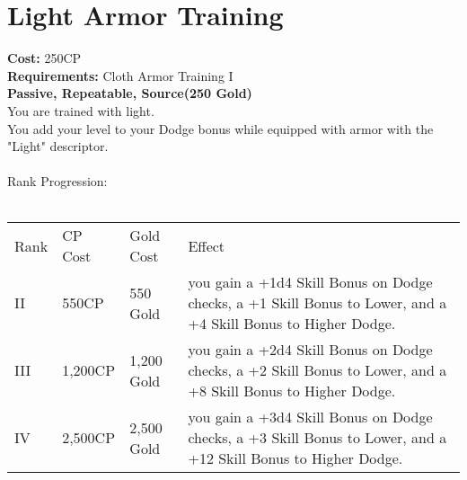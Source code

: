 \section{Light Armor Training}\label{perk:lightArmorTraining}
\textbf{Cost:} 250CP\\
\textbf{Requirements:} Cloth Armor Training I\\
\textbf{Passive, Repeatable, Source(250 Gold)}\\
You are trained with light.\\
You add your level to your Dodge bonus while equipped with armor with the "Light" descriptor.\\
\\

Rank Progression:\\
\\
\begin{longtable}{l | l | l | p{9cm}}
	Rank & CP Cost & Gold Cost & Effect\\
	II & 550CP & 550 Gold & you gain a +1d4 Skill Bonus on Dodge checks, a +1 Skill Bonus to Lower, and a +4 Skill Bonus to Higher Dodge.\\
	III & 1,200CP & 1,200 Gold & you gain a +2d4 Skill Bonus on Dodge checks, a +2 Skill Bonus to Lower, and a +8 Skill Bonus to Higher Dodge.\\
	IV & 2,500CP & 2,500 Gold & you gain a +3d4 Skill Bonus on Dodge checks, a +3 Skill Bonus to Lower, and a +12 Skill Bonus to Higher Dodge.\\
\end{longtable}
